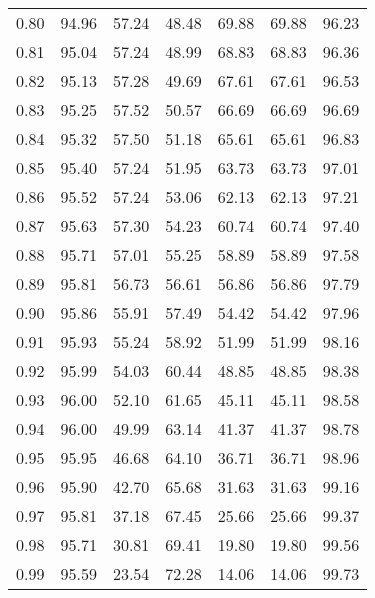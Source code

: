 \begin{tabular}{|c|c|c|c|c|c|c|}
      0.80 &     94.96 &     57.24 &      48.48 &   69.88 &      69.88 &         96.23 \\
      0.81 &     95.04 &     57.24 &      48.99 &   68.83 &      68.83 &         96.36 \\
      0.82 &     95.13 &     57.28 &      49.69 &   67.61 &      67.61 &         96.53 \\
      0.83 &     95.25 &     57.52 &      50.57 &   66.69 &      66.69 &         96.69 \\
      0.84 &     95.32 &     57.50 &      51.18 &   65.61 &      65.61 &         96.83 \\
      0.85 &     95.40 &     57.24 &      51.95 &   63.73 &      63.73 &         97.01 \\
      0.86 &     95.52 &     57.24 &      53.06 &   62.13 &      62.13 &         97.21 \\
      0.87 &     95.63 &     57.30 &      54.23 &   60.74 &      60.74 &         97.40 \\
      0.88 &     95.71 &     57.01 &      55.25 &   58.89 &      58.89 &         97.58 \\
      0.89 &     95.81 &     56.73 &      56.61 &   56.86 &      56.86 &         97.79 \\
      0.90 &     95.86 &     55.91 &      57.49 &   54.42 &      54.42 &         97.96 \\
      0.91 &     95.93 &     55.24 &      58.92 &   51.99 &      51.99 &         98.16 \\
      0.92 &     95.99 &     54.03 &      60.44 &   48.85 &      48.85 &         98.38 \\
      0.93 &     96.00 &     52.10 &      61.65 &   45.11 &      45.11 &         98.58 \\
      0.94 &     96.00 &     49.99 &      63.14 &   41.37 &      41.37 &         98.78 \\
      0.95 &     95.95 &     46.68 &      64.10 &   36.71 &      36.71 &         98.96 \\
      0.96 &     95.90 &     42.70 &      65.68 &   31.63 &      31.63 &         99.16 \\
      0.97 &     95.81 &     37.18 &      67.45 &   25.66 &      25.66 &         99.37 \\
      0.98 &     95.71 &     30.81 &      69.41 &   19.80 &      19.80 &         99.56 \\
      0.99 &     95.59 &     23.54 &      72.28 &   14.06 &      14.06 &         99.73 \\
\bottomrule
\end{tabular}
